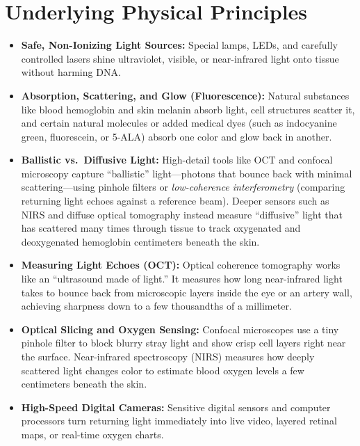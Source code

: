 \section{Underlying Physical Principles}
\begin{itemize}
  \item \textbf{Safe, Non-Ionizing Light Sources:} Special lamps, LEDs, and carefully controlled lasers shine ultraviolet, visible, or near-infrared light onto tissue without harming DNA.
  \item \textbf{Absorption, Scattering, and Glow (Fluorescence):} Natural substances like blood hemoglobin and skin melanin absorb light, cell structures scatter it, and certain natural molecules or added medical dyes (such as indocyanine green, fluorescein, or 5-ALA) absorb one color and glow back in another.
  \item \textbf{Ballistic vs.\ Diffusive Light:} High-detail tools like OCT and confocal microscopy capture ``ballistic'' light---photons that bounce back with minimal scattering---using pinhole filters or \emph{low-coherence interferometry} (comparing returning light echoes against a reference beam). Deeper sensors such as NIRS and diffuse optical tomography instead measure ``diffusive'' light that has scattered many times through tissue to track oxygenated and deoxygenated hemoglobin centimeters beneath the skin.
  \item \textbf{Measuring Light Echoes (OCT):} Optical coherence tomography works like an ``ultrasound made of light.'' It measures how long near-infrared light takes to bounce back from microscopic layers inside the eye or an artery wall, achieving sharpness down to a few thousandths of a millimeter.
  \item \textbf{Optical Slicing and Oxygen Sensing:} Confocal microscopes use a tiny pinhole filter to block blurry stray light and show crisp cell layers right near the surface. Near-infrared spectroscopy (NIRS) measures how deeply scattered light changes color to estimate blood oxygen levels a few centimeters beneath the skin.
  \item \textbf{High-Speed Digital Cameras:} Sensitive digital sensors and computer processors turn returning light immediately into live video, layered retinal maps, or real-time oxygen charts.
\end{itemize}

